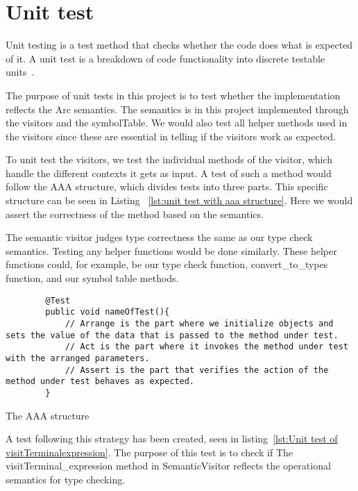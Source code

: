 \section{Unit test}\label{subsec:unittest}
Unit testing is a test method that checks whether the code does what is expected of it. A unit test is a breakdown of code functionality into discrete testable units~\cite{UnitTestBasic}.

The purpose of unit tests in this project is to test whether the implementation reflects the Arc semantics. The semantics is in this project implemented through the visitors and the symbolTable. We would also test all helper methods used in the visitors since these are essential in telling if the visitors work as expected.

To unit test the visitors, we test the individual methods of the visitor, which handle the different contexts it gets as input. A test of such a method would follow the AAA structure, which divides tests into three parts. This specific structure can be seen in Listing ~\ref{lst:unit test with aaa structure}. Here we would assert the correctness of the method based on the semantics.

The semantic visitor judges type correctness the same as our type check semantics. Testing any helper functions would be done similarly. These helper functions could, for example, be our type check function, convert\_to\_types function, and our symbol table methods. 

\begin{listing}[htb!]
    \begin{verbatim}
        @Test
        public void nameOfTest(){
            // Arrange is the part where we initialize objects and sets the value of the data that is passed to the method under test.
            // Act is the part where it invokes the method under test with the arranged parameters.
            // Assert is the part that verifies the action of the method under test behaves as expected. 
        }
    \end{verbatim}
    \caption{The AAA structure}
    \label{lst:unit test with aaa structure}
\end{listing}

A test following this strategy has been created, seen in listing~\ref{lst:Unit test of visitTerminalexpression}. The purpose of this test is to check if The visitTerminal\_expression method in SemanticVisitor reflects the operational semantics for type checking.

